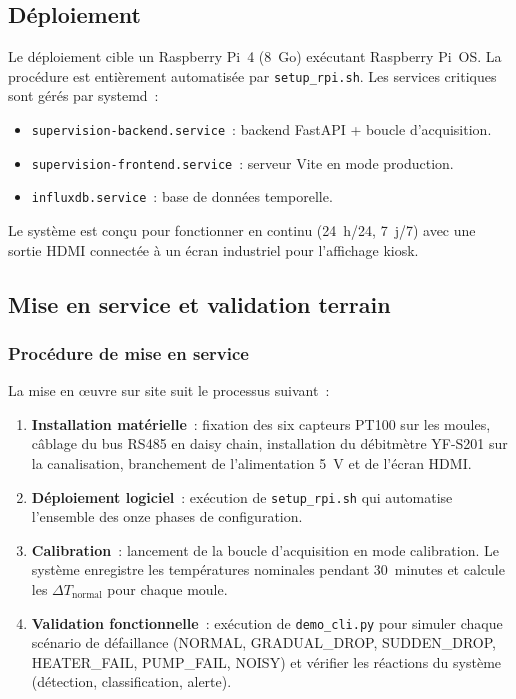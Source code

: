 \subsection{Déploiement}

Le déploiement cible un Raspberry Pi~4 (8~Go) exécutant Raspberry Pi~OS. La procédure est entièrement automatisée par \texttt{setup\_rpi.sh}. Les services critiques sont gérés par systemd~:

\begin{itemize}
  \item \texttt{supervision-backend.service}~: backend FastAPI + boucle d'acquisition.
  \item \texttt{supervision-frontend.service}~: serveur Vite en mode production.
  \item \texttt{influxdb.service}~: base de données temporelle.
\end{itemize}

Le système est conçu pour fonctionner en continu (24~h/24, 7~j/7) avec une sortie HDMI connectée à un écran industriel pour l'affichage kiosk.

\subsection{Mise en service et validation terrain}

\subsubsection{Procédure de mise en service}

La mise en œuvre sur site suit le processus suivant~:

\begin{enumerate}
  \item \textbf{Installation matérielle}~: fixation des six capteurs PT100 sur les moules, câblage du bus RS485 en daisy chain, installation du débitmètre YF-S201 sur la canalisation, branchement de l'alimentation 5~V et de l'écran HDMI.
  \item \textbf{Déploiement logiciel}~: exécution de \texttt{setup\_rpi.sh} qui automatise l'ensemble des onze phases de configuration.
  \item \textbf{Calibration}~: lancement de la boucle d'acquisition en mode calibration. Le système enregistre les températures nominales pendant 30~minutes et calcule les \(\Delta T_{\text{normal}}\) pour chaque moule.
  \item \textbf{Validation fonctionnelle}~: exécution de \texttt{demo\_cli.py} pour simuler chaque scénario de défaillance (NORMAL, GRADUAL\_DROP, SUDDEN\_DROP, HEATER\_FAIL, PUMP\_FAIL, NOISY) et vérifier les réactions du système (détection, classification, alerte).
\end{enumerate}

